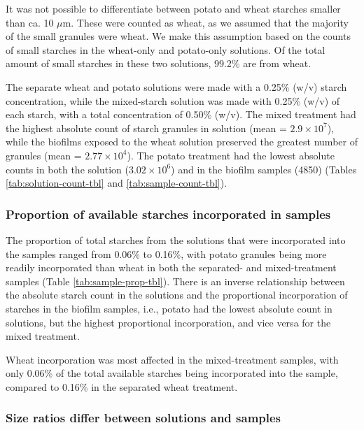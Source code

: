 \documentclass[utf8]{frontiers/frontiersSCNS}
\begin{document}
It was not possible to differentiate between potato and
wheat starches smaller than ca. 10 \(\mu\)m. These were counted as wheat,
as we assumed that the majority of the small granules were wheat. We make this
assumption based on the counts of small starches in the wheat-only and potato-only
solutions. Of the total amount of small starches in these two solutions,
99.2\%
are from wheat.

The separate wheat and potato solutions were made with a 0.25\% (w/v) starch
concentration, while the mixed-starch solution was made with 0.25\% (w/v) of each
starch, with a total concentration of 0.50\% (w/v).
The mixed treatment had the highest absolute count of starch granules in solution (mean = \ensuremath{2.9\times 10^{7}}),
while the biofilms exposed to the wheat solution preserved the greatest number of
granules
(mean = \ensuremath{2.77\times 10^{4}}).
The potato treatment had the lowest absolute counts in both the solution
(\ensuremath{3.02\times 10^{6}})
and in the biofilm samples
(4850)
(Tables \ref{tab:solution-count-tbl} and \ref{tab:sample-count-tbl}).

\hypertarget{proportion-of-available-starches-incorporated-in-samples}{%
\subsubsection{Proportion of available starches incorporated in samples}\label{proportion-of-available-starches-incorporated-in-samples}}

The proportion of total starches from the solutions that were incorporated
into the samples ranged from
0.06\% to 0.16\%,
with potato granules being more readily incorporated than wheat in both the
separated- and mixed-treatment samples
(Table \ref{tab:sample-prop-tbl}).
There is an inverse relationship between the absolute starch count in the solutions
and the proportional incorporation of starches in the biofilm samples, i.e., potato
had the lowest absolute count in solutions, but the highest proportional
incorporation, and vice versa for the mixed treatment.

Wheat incorporation was most affected in the mixed-treatment samples, with only
0.06\% of the total available starches being incorporated into
the sample, compared to
0.16\%
in the separated wheat treatment.

\hypertarget{size-ratios-differ-between-solutions-and-samples}{%
\subsubsection{Size ratios differ between solutions and samples}\label{size-ratios-differ-between-solutions-and-samples}}
\end{document}
